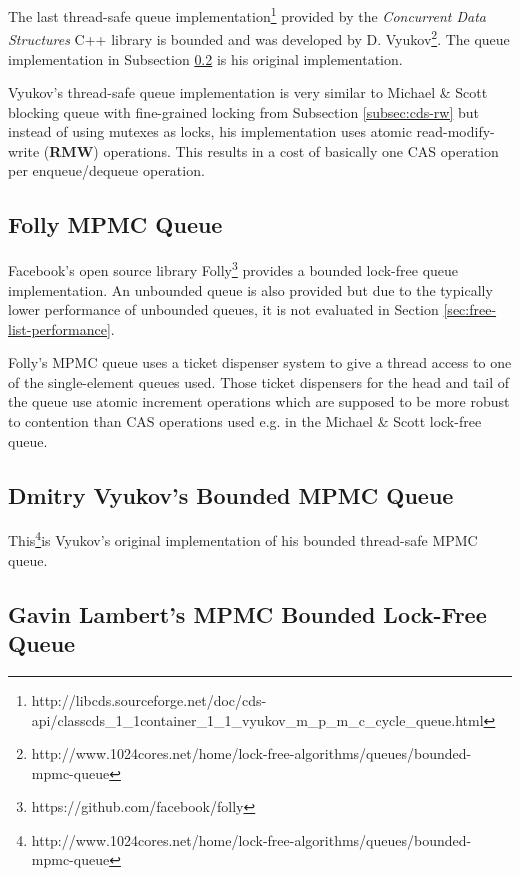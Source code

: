 	The last thread-safe queue implementation\footnote{http://libcds.sourceforge.net/doc/cds-api/classcds\_1\_1container\_1\_1\_vyukov\_m\_p\_m\_c\_cycle\_queue.html} provided by the \textit{Concurrent Data Structures} C++ library is bounded and was developed by D. Vyukov\footnote{http://www.1024cores.net/home/lock-free-algorithms/queues/bounded-mpmc-queue}. The queue implementation in Subsection \ref{subsec:vyukov} is his original implementation.
	
	Vyukov's thread-safe queue implementation is very similar to Michael \& Scott blocking queue with fine-grained locking from Subsection \ref{subsec:cds-rw} but instead of using mutexes as locks, his implementation uses atomic read-modify-write (\textbf{RMW}) operations. This results in a cost of basically one CAS operation per enqueue/dequeue operation.

\subsection[Folly MPMC Queue]{Folly MPMC Queue} \label{subsec:folly-mpmc}

	Facebook's open source library Folly\footnote{https://github.com/facebook/folly} provides a bounded lock-free queue implementation. An unbounded queue is also provided but due to the typically lower performance of unbounded queues, it is not evaluated in Section \ref{sec:free-list-performance}.
	
	Folly's MPMC queue uses a ticket dispenser system to give a thread access to one of the single-element queues used. Those ticket dispensers for the head and tail of the queue use atomic increment operations which are supposed to be more robust to contention than CAS operations used e.g. in the Michael \& Scott lock-free queue.

\subsection[Dmitry Vyukov's MPMC Queue]{Dmitry Vyukov's Bounded MPMC Queue} \label{subsec:vyukov}

	This\footnote{http://www.1024cores.net/home/lock-free-algorithms/queues/bounded-mpmc-queue}is Vyukov's original implementation of his bounded thread-safe MPMC queue.

\subsection[Gavin Lambert's MPMC Queue]{Gavin Lambert's MPMC Bounded Lock-Free Queue} \label{subsec:lampert}

